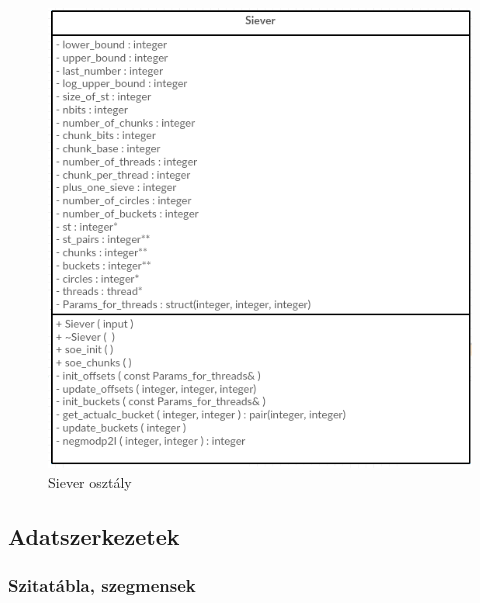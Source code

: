 \documentclass[twoside, a4paper, 12pt]{article}
\begin{document}
\begin{figure}[h]
\centering
\includegraphics{img/siever.png}
\caption{Siever osztály}
\end{figure}

\clearpage
\subsection{Adatszerkezetek}

\subsubsection{Szitatábla, szegmensek}
\end{document}
